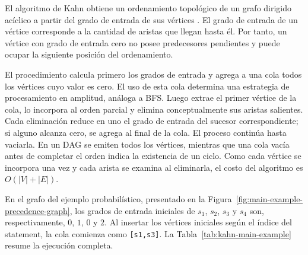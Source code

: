 El algoritmo de Kahn obtiene un ordenamiento topológico de un grafo dirigido acíclico a partir del grado de entrada de sus vértices \cite{Kahn1962}. El grado de entrada de un vértice corresponde a la cantidad de aristas que llegan hasta él. Por tanto, un vértice con grado de entrada cero no posee predecesores pendientes y puede ocupar la siguiente posición del ordenamiento.

El procedimiento calcula primero los grados de entrada y agrega a una cola todos los vértices cuyo valor es cero. El uso de esta cola determina una estrategia de procesamiento en amplitud, análoga a BFS. Luego extrae el primer vértice de la cola, lo incorpora al orden parcial y elimina conceptualmente sus aristas salientes. Cada eliminación reduce en uno el grado de entrada del sucesor correspondiente; si alguno alcanza cero, se agrega al final de la cola. El proceso continúa hasta vaciarla. En un DAG se emiten todos los vértices, mientras que una cola vacía antes de completar el orden indica la existencia de un ciclo. Como cada vértice se incorpora una vez y cada arista se examina al eliminarla, el costo del algoritmo es $O(|V|+|E|)$.

En el grafo del ejemplo probabilístico, presentado en la Figura~\ref{fig:main-example-precedence-graph}, los grados de entrada iniciales de $s_1$, $s_2$, $s_3$ y $s_4$ son, respectivamente, $0$, $1$, $0$ y $2$. Al insertar los vértices iniciales según el índice del statement, la cola comienza como \texttt{[s1,s3]}. La Tabla~\ref{tab:kahn-main-example} resume la ejecución completa.

\begin{table}[ht]
\centering
\TableSetup
{}
\caption{Aplicación del algoritmo de Kahn al grafo del ejemplo probabilístico.}
\label{tab:kahn-main-example}
\end{table}


